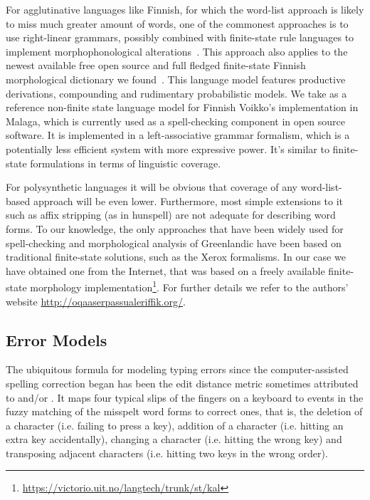 \documentclass[11pt]{article}
\begin{document}
For agglutinative languages like Finnish, for which the word-list approach is
likely to miss much greater amount of words, one of the commonest approaches is
to use right-linear grammars, possibly combined with finite-state rule
languages to implement morphophonological alterations~\cite{koskenniemi/1983}.
This approach also applies to the newest available free open source and full
fledged finite-state Finnish morphological dictionary we
found~\cite{pirinen/2011/nodalida}. This language model features productive
derivations, compounding and rudimentary probabilistic models.  We take as a
reference non-finite state language model for Finnish Voikko's implementation
in Malaga, which is currently used as a spell-checking component in open source
software. It is implemented in a left-associative grammar formalism, which is a
potentially less efficient system with more expressive power. It's similar to
finite-state formulations in terms of linguistic coverage.

For polysynthetic languages it will be obvious that coverage of any
word-list-based approach will be even lower. Furthermore, most simple
extensions to it such as affix stripping (as in hunspell) are not adequate for
describing word forms. To our knowledge, the only approaches that have been
widely used for spell-checking and morphological analysis of Greenlandic have
been based on traditional finite-state solutions, such as the Xerox formalisms.
In our case we have obtained one from the Internet, that was based on a freely
available finite-state morphology
implementation\footnote{\url{https://victorio.uit.no/langtech/trunk/st/kal}}.
For further details we refer to the authors' website
\url{http://oqaaserpassualeriffik.org/}.

\subsection{Error Models}
\label{subsec:error-models}

The ubiquitous formula for modeling typing errors since the computer-assisted
spelling correction began has been the edit distance metric sometimes
attributed to  and/or . It maps
four typical slips of the fingers on a keyboard to events in the fuzzy matching
of the misspelt word forms to correct ones, that is, the deletion of a
character (i.e. failing to press a key), addition of a character (i.e. hitting
an extra key accidentally), changing a character (i.e. hitting the wrong key)
and transposing adjacent characters (i.e. hitting two keys in the wrong order).
\end{document}
